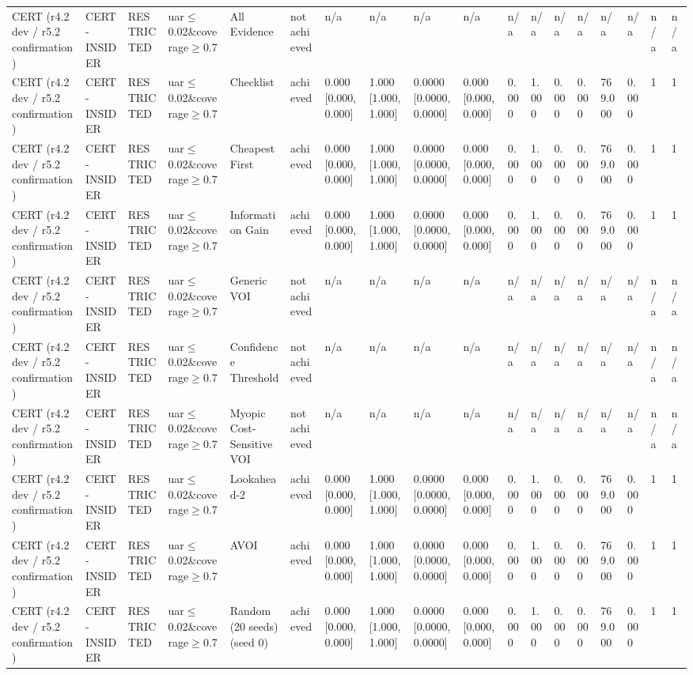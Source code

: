 \begin{table}[!ht]
{\begin{tabular}{llllllllllllllllll}
CERT (r4.2 dev / r5.2 confirmation) & CERT-INSIDER & RESTRICTED & uar$\le$0.02\&coverage$\ge$0.7 & All Evidence & not achieved & n/a & n/a & n/a & n/a & n/a & n/a & n/a & n/a & n/a & n/a & n/a & n/a \\
CERT (r4.2 dev / r5.2 confirmation) & CERT-INSIDER & RESTRICTED & uar$\le$0.02\&coverage$\ge$0.7 & Checklist & achieved & 0.000 [0.000, 0.000] & 1.000 [1.000, 1.000] & 0.0000 [0.0000, 0.0000] & 0.000 [0.000, 0.000] & 0.000 & 1.000 & 0.000 & 0.000 & 769.000 & 0.000 & 1 & 1 \\
CERT (r4.2 dev / r5.2 confirmation) & CERT-INSIDER & RESTRICTED & uar$\le$0.02\&coverage$\ge$0.7 & Cheapest First & achieved & 0.000 [0.000, 0.000] & 1.000 [1.000, 1.000] & 0.0000 [0.0000, 0.0000] & 0.000 [0.000, 0.000] & 0.000 & 1.000 & 0.000 & 0.000 & 769.000 & 0.000 & 1 & 1 \\
CERT (r4.2 dev / r5.2 confirmation) & CERT-INSIDER & RESTRICTED & uar$\le$0.02\&coverage$\ge$0.7 & Information Gain & achieved & 0.000 [0.000, 0.000] & 1.000 [1.000, 1.000] & 0.0000 [0.0000, 0.0000] & 0.000 [0.000, 0.000] & 0.000 & 1.000 & 0.000 & 0.000 & 769.000 & 0.000 & 1 & 1 \\
CERT (r4.2 dev / r5.2 confirmation) & CERT-INSIDER & RESTRICTED & uar$\le$0.02\&coverage$\ge$0.7 & Generic VOI & not achieved & n/a & n/a & n/a & n/a & n/a & n/a & n/a & n/a & n/a & n/a & n/a & n/a \\
CERT (r4.2 dev / r5.2 confirmation) & CERT-INSIDER & RESTRICTED & uar$\le$0.02\&coverage$\ge$0.7 & Confidence Threshold & not achieved & n/a & n/a & n/a & n/a & n/a & n/a & n/a & n/a & n/a & n/a & n/a & n/a \\
CERT (r4.2 dev / r5.2 confirmation) & CERT-INSIDER & RESTRICTED & uar$\le$0.02\&coverage$\ge$0.7 & Myopic Cost-Sensitive VOI & not achieved & n/a & n/a & n/a & n/a & n/a & n/a & n/a & n/a & n/a & n/a & n/a & n/a \\
CERT (r4.2 dev / r5.2 confirmation) & CERT-INSIDER & RESTRICTED & uar$\le$0.02\&coverage$\ge$0.7 & Lookahead-2 & achieved & 0.000 [0.000, 0.000] & 1.000 [1.000, 1.000] & 0.0000 [0.0000, 0.0000] & 0.000 [0.000, 0.000] & 0.000 & 1.000 & 0.000 & 0.000 & 769.000 & 0.000 & 1 & 1 \\
CERT (r4.2 dev / r5.2 confirmation) & CERT-INSIDER & RESTRICTED & uar$\le$0.02\&coverage$\ge$0.7 & AVOI & achieved & 0.000 [0.000, 0.000] & 1.000 [1.000, 1.000] & 0.0000 [0.0000, 0.0000] & 0.000 [0.000, 0.000] & 0.000 & 1.000 & 0.000 & 0.000 & 769.000 & 0.000 & 1 & 1 \\
CERT (r4.2 dev / r5.2 confirmation) & CERT-INSIDER & RESTRICTED & uar$\le$0.02\&coverage$\ge$0.7 & Random (20 seeds) (seed 0) & achieved & 0.000 [0.000, 0.000] & 1.000 [1.000, 1.000] & 0.0000 [0.0000, 0.0000] & 0.000 [0.000, 0.000] & 0.000 & 1.000 & 0.000 & 0.000 & 769.000 & 0.000 & 1 & 1 \\

\end{tabular}}
\end{table}
